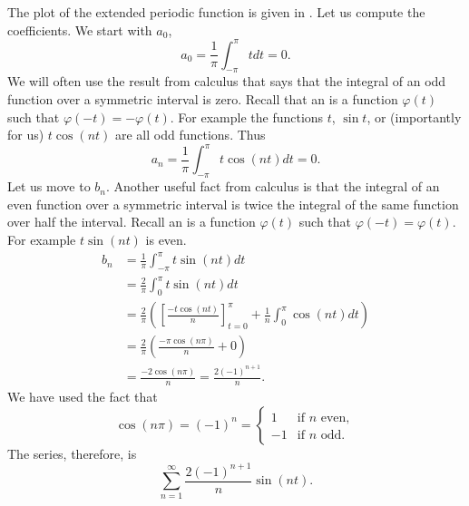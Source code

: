\documentclass{ximera}
\begin{document}
\begin{exampleSol}
    The plot of the extended periodic function is given in . Let us compute the coefficients.  We start with $a_0$,
    \begin{equation*}
        a_0 = \frac{1}{\pi} \int_{-\pi}^\pi t dt = 0 .
    \end{equation*}
    We will often use the result from calculus that says that the integral of an odd function over a symmetric interval is zero.  Recall that an \emph{} is a function $\varphi(t)$ such that $\varphi(-t) = -\varphi(t)$.  For example the functions $t$, $\sin t$, or (importantly for us) $t \cos (nt)$ are all odd functions.  Thus
    \begin{equation*}
        a_n = \frac{1}{\pi} \int_{-\pi}^\pi t \cos (nt) dt = 0 .
    \end{equation*}
    Let us move to $b_n$.  Another useful fact from calculus is that the integral of an even function over a symmetric interval is twice the integral of the same function over half the interval. Recall an \emph{} is a function $\varphi(t)$ such that $\varphi(-t) = \varphi(t)$.  For example $t \sin (nt)$ is even.
    \begin{equation*}
        \begin{split}
            b_n & = \frac{1}{\pi} \int_{-\pi}^\pi t \sin (nt) dt \\
            & = \frac{2}{\pi} \int_{0}^\pi t \sin (nt) dt \\
            & = \frac{2}{\pi} \left( \left[ \frac{-t \cos (nt)}{n} \right]_{t=0}^{\pi} + \frac{1}{n} \int_{0}^\pi \cos (nt) dt \right) \\
            & = \frac{2}{\pi} \left(\frac{-\pi \cos (n\pi)}{n} + 0 \right) \\
            & =  \frac{-2 \cos (n\pi)}{n} =  \frac{2 {(-1)}^{n+1}}{n} .
        \end{split}
    \end{equation*}
    We have used the fact that 
    \begin{equation*}
        \cos (n\pi) = {(-1)}^n =
        \begin{cases}
            1 & \text{if } n \text{ even} , \\
            -1 & \text{if } n \text{ odd} .
        \end{cases}
    \end{equation*}
    The series, therefore, is
    \begin{equation*}
    \sum_{n=1}^\infty \frac{2 {(-1)}^{n+1}}{n}  \sin (n t) .
    \end{equation*}
    

\end{exampleSol}
\end{document}
